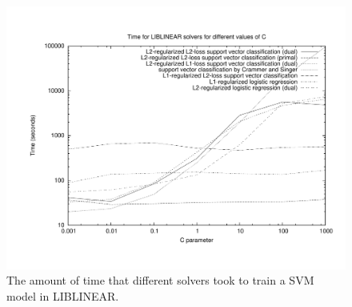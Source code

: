 \begin{figure}[t]
\centering
\includegraphics[width=\columnwidth]{figures/gnuplot-calls-liblinear-time}
\caption{The amount of time that different solvers took to train a SVM
  model in LIBLINEAR.}
\label{fig:gnuplot-calls-liblinear-time}
\end{figure}



